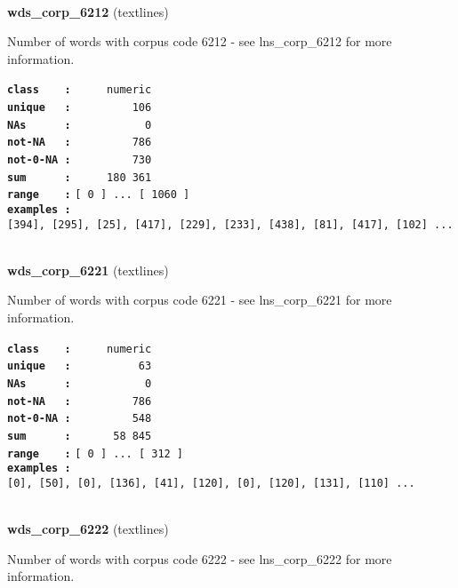 \documentclass[]{article}
\begin{document}
~

\textbf{wds\_corp\_6212} (textlines)

Number of words with corpus code 6212 - see lns\_corp\_6212 for more
information.

\textbf{\texttt{class\ \ \ \ :}} \texttt{~~~~~numeric}\\
\textbf{\texttt{unique\ \ \ :}} \texttt{~~~~~~~~~106}\\
\textbf{\texttt{NAs\ \ \ \ \ \ :}} \texttt{~~~~~~~~~~~0}\\
\textbf{\texttt{not-NA\ \ \ :}} \texttt{~~~~~~~~~786}\\
\textbf{\texttt{not-0-NA\ :}} \texttt{~~~~~~~~~730}\\
\textbf{\texttt{sum\ \ \ \ \ \ :}} \texttt{~~~~~180~361}\\
\textbf{\texttt{range\ \ \ \ :}}
\texttt{{[}\ 0\ {]}\ ...\ {[}\ 1060\ {]}}\\
\textbf{\texttt{examples\ :}}
\texttt{{[}394{]},\ {[}295{]},\ {[}25{]},\ {[}417{]},\ {[}229{]},\ {[}233{]},\ {[}438{]},\ {[}81{]},\ {[}417{]},\ {[}102{]}\ ...}\\

~

\textbf{wds\_corp\_6221} (textlines)

Number of words with corpus code 6221 - see lns\_corp\_6221 for more
information.

\textbf{\texttt{class\ \ \ \ :}} \texttt{~~~~~numeric}\\
\textbf{\texttt{unique\ \ \ :}} \texttt{~~~~~~~~~~63}\\
\textbf{\texttt{NAs\ \ \ \ \ \ :}} \texttt{~~~~~~~~~~~0}\\
\textbf{\texttt{not-NA\ \ \ :}} \texttt{~~~~~~~~~786}\\
\textbf{\texttt{not-0-NA\ :}} \texttt{~~~~~~~~~548}\\
\textbf{\texttt{sum\ \ \ \ \ \ :}} \texttt{~~~~~~58~845}\\
\textbf{\texttt{range\ \ \ \ :}}
\texttt{{[}\ 0\ {]}\ ...\ {[}\ 312\ {]}}\\
\textbf{\texttt{examples\ :}}
\texttt{{[}0{]},\ {[}50{]},\ {[}0{]},\ {[}136{]},\ {[}41{]},\ {[}120{]},\ {[}0{]},\ {[}120{]},\ {[}131{]},\ {[}110{]}\ ...}\\

~

\textbf{wds\_corp\_6222} (textlines)

Number of words with corpus code 6222 - see lns\_corp\_6222 for more
information.
\end{document}
